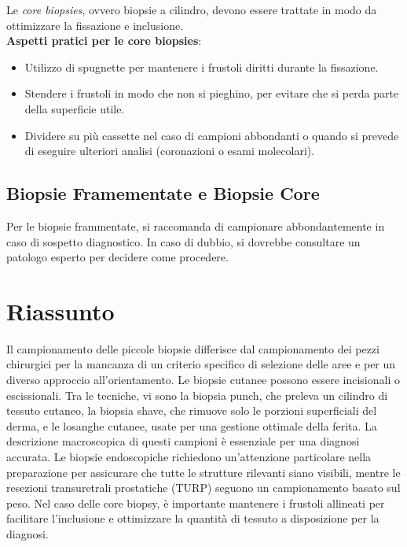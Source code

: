 Le \textit{core biopsies}, ovvero biopsie a cilindro, devono essere trattate in modo da ottimizzare la fissazione e inclusione. 
\\ \textbf{Aspetti pratici per le core biopsies}:
\begin{itemize}
    \item Utilizzo di spugnette per mantenere i frustoli diritti durante la fissazione.
    \item Stendere i frustoli in modo che non si pieghino, per evitare che si perda parte della superficie utile.
    \item Dividere su più cassette nel caso di campioni abbondanti o quando si prevede di eseguire ulteriori analisi (coronazioni o esami molecolari).
\end{itemize}

\subsection{Biopsie Framementate e Biopsie Core}
Per le biopsie frammentate, si raccomanda di campionare abbondantemente in caso di sospetto diagnostico. In caso di dubbio, si dovrebbe consultare un patologo esperto per decidere come procedere. 

\section{Riassunto}

Il campionamento delle piccole biopsie differisce dal campionamento dei pezzi chirurgici per la mancanza di un criterio specifico di selezione delle aree e per un diverso approccio all'orientamento.  Le biopsie cutanee possono essere incisionali o escissionali. Tra le tecniche, vi sono la biopsia punch, che preleva un cilindro di tessuto cutaneo, la biopsia shave, che rimuove solo le porzioni superficiali del derma, e le losanghe cutanee, usate per una gestione ottimale della ferita. La descrizione macroscopica di questi campioni è essenziale per una diagnosi accurata. Le biopsie endoscopiche richiedono un'attenzione particolare nella preparazione per assicurare che tutte le strutture rilevanti siano visibili, mentre le resezioni transuretrali prostatiche (TURP) seguono un campionamento basato sul peso. Nel caso delle core biopsy, è importante mantenere i frustoli allineati per facilitare l'inclusione e ottimizzare la quantità di tessuto a disposizione per la diagnosi.

